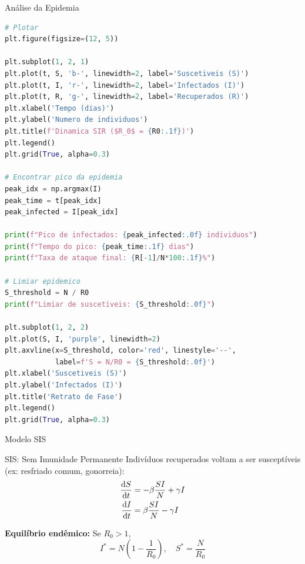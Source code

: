 \begin{frame}[fragile]{Análise da Epidemia}
\begin{lstlisting}[language=Python, caption=Análise de resultados]
# Plotar
plt.figure(figsize=(12, 5))

plt.subplot(1, 2, 1)
plt.plot(t, S, 'b-', linewidth=2, label='Suscetiveis (S)')
plt.plot(t, I, 'r-', linewidth=2, label='Infectados (I)')
plt.plot(t, R, 'g-', linewidth=2, label='Recuperados (R)')
plt.xlabel('Tempo (dias)')
plt.ylabel('Numero de individuos')
plt.title(f'Dinamica SIR ($R_0$ = {R0:.1f})')
plt.legend()
plt.grid(True, alpha=0.3)

# Encontrar pico da epidemia
peak_idx = np.argmax(I)
peak_time = t[peak_idx]
peak_infected = I[peak_idx]

print(f"Pico de infectados: {peak_infected:.0f} individuos")
print(f"Tempo do pico: {peak_time:.1f} dias")
print(f"Taxa de ataque final: {R[-1]/N*100:.1f}%")

# Limiar epidemico
S_threshold = N / R0
print(f"Limiar de suscetiveis: {S_threshold:.0f}")

plt.subplot(1, 2, 2)
plt.plot(S, I, 'purple', linewidth=2)
plt.axvline(x=S_threshold, color='red', linestyle='--',
            label=f'S = N/R0 = {S_threshold:.0f}')
plt.xlabel('Suscetiveis (S)')
plt.ylabel('Infectados (I)')
plt.title('Retrato de Fase')
plt.legend()
plt.grid(True, alpha=0.3)
\end{lstlisting}
\end{frame}

\begin{frame}{Modelo SIS}
\begin{block}{SIS: Sem Imunidade Permanente}
Indivíduos recuperados voltam a ser susceptíveis (ex: resfriado comum, gonorreia):
\begin{align*}
\frac{\mathrm{d} S}{\mathrm{d} t} &= -\beta \frac{SI}{N} + \gamma I\\
\frac{\mathrm{d} I}{\mathrm{d} t} &= \beta \frac{SI}{N} - \gamma I
\end{align*}
\end{block}

\begin{center}
\end{center}

\textbf{Equilíbrio endêmico:} Se $R_0 > 1$,
\begin{equation*}
I^* = N\left(1 - \frac{1}{R_0}\right), \quad S^* = \frac{N}{R_0}
\end{equation*}

\end{frame}

